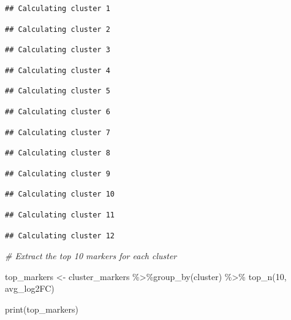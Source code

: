 \documentclass[
]{article}
\newenvironment{Shaded}{\begin{snugshade}}{\end{snugshade}}
\newcommand{\CommentTok}[1]{\textcolor[rgb]{0.56,0.35,0.01}{\textit{#1}}}
\newcommand{\DecValTok}[1]{\textcolor[rgb]{0.00,0.00,0.81}{#1}}
\newcommand{\FunctionTok}[1]{\textcolor[rgb]{0.00,0.00,0.00}{#1}}
\newcommand{\NormalTok}[1]{#1}
\newcommand{\OtherTok}[1]{\textcolor[rgb]{0.56,0.35,0.01}{#1}}
\newcommand{\SpecialCharTok}[1]{\textcolor[rgb]{0.00,0.00,0.00}{#1}}
\begin{document}
\begin{verbatim}
## Calculating cluster 1
\end{verbatim}

\begin{verbatim}
## Calculating cluster 2
\end{verbatim}

\begin{verbatim}
## Calculating cluster 3
\end{verbatim}

\begin{verbatim}
## Calculating cluster 4
\end{verbatim}

\begin{verbatim}
## Calculating cluster 5
\end{verbatim}

\begin{verbatim}
## Calculating cluster 6
\end{verbatim}

\begin{verbatim}
## Calculating cluster 7
\end{verbatim}

\begin{verbatim}
## Calculating cluster 8
\end{verbatim}

\begin{verbatim}
## Calculating cluster 9
\end{verbatim}

\begin{verbatim}
## Calculating cluster 10
\end{verbatim}

\begin{verbatim}
## Calculating cluster 11
\end{verbatim}

\begin{verbatim}
## Calculating cluster 12
\end{verbatim}

\begin{Shaded}
\begin{Highlighting}[]
\CommentTok{\# Extract the top 10 markers for each cluster}

\NormalTok{top\_markers }\OtherTok{\textless{}{-}}\NormalTok{ cluster\_markers }\SpecialCharTok{\%\textgreater{}\%}\FunctionTok{group\_by}\NormalTok{(cluster) }\SpecialCharTok{\%\textgreater{}\%} \FunctionTok{top\_n}\NormalTok{(}\DecValTok{10}\NormalTok{, avg\_log2FC)}

\FunctionTok{print}\NormalTok{(top\_markers)}
\end{Highlighting}
\end{Shaded}
\end{document}
